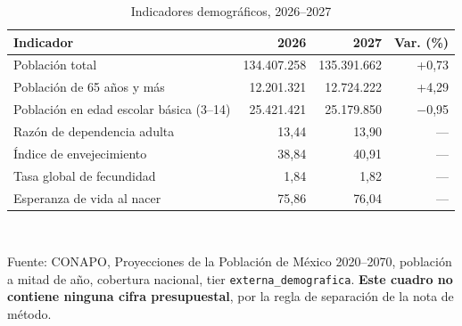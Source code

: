 \begin{table}[htbp]\centering\small
\caption{Indicadores demográficos, 2026--2027}\label{cua:demo}
\begin{tabular}{lrrr}
\toprule
Indicador & 2026 & 2027 & Var. (\%) \\
\midrule
Población total & 134.407.258 & 135.391.662 & +0,73 \\
Población de 65 años y más & 12.201.321 & 12.724.222 & +4,29 \\
Población en edad escolar básica (3--14) & 25.421.421 & 25.179.850 & $-$0,95 \\
Razón de dependencia adulta & 13,44 & 13,90 & --- \\
Índice de envejecimiento & 38,84 & 40,91 & --- \\
Tasa global de fecundidad & 1,84 & 1,82 & --- \\
Esperanza de vida al nacer & 75,86 & 76,04 & --- \\
\bottomrule
\end{tabular}
\\[2pt]\begin{minipage}{0.92\textwidth}\scriptsize Fuente: CONAPO, Proyecciones de la Población de México 2020--2070, población a mitad de año, cobertura nacional, tier \texttt{externa\_demografica}. \textbf{Este cuadro no contiene ninguna cifra presupuestal}, por la regla de separación de la nota de método.\end{minipage}
\end{table}
